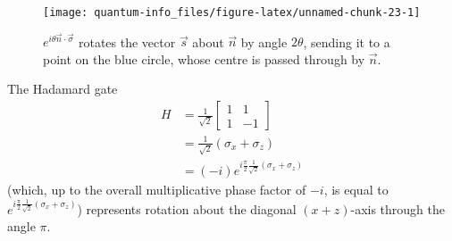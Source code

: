 \documentclass{article}
\begin{document}
\begin{figure}[H]

{\centering \texttt{[image: quantum-info\_files/figure-latex/unnamed-chunk-23-1]} 

}

\caption{\(e^{i\theta\vec{n}\cdot\vec{\sigma}}\) rotates the vector \(\vec{s}\) about \(\vec{n}\) by angle \(2\theta\), sending it to a point on the blue circle, whose centre is passed through by \(\vec{n}\).}\label{fig:unnamed-chunk-23}
\end{figure}

The Hadamard gate
\[
  \begin{aligned}
    H
    &= \frac{1}{\sqrt 2}
    \begin{bmatrix}
      1& 1
    \\1 & -1
    \end{bmatrix}
  \\&= \frac{1}{\sqrt 2}(\sigma_x + \sigma_z)
  \\&= (-i)e^{i \frac{\pi}{2} \frac{1}{\sqrt 2}(\sigma_x+\sigma_z)}
  \end{aligned}
\]
(which, up to the overall multiplicative phase factor of \(-i\), is equal to \(e^{i \frac{\pi}{2} \frac{1}{\sqrt 2}(\sigma_x+\sigma_z)}\)) represents rotation about the diagonal \((x+z)\)-axis through the angle \(\pi\).
\end{document}
